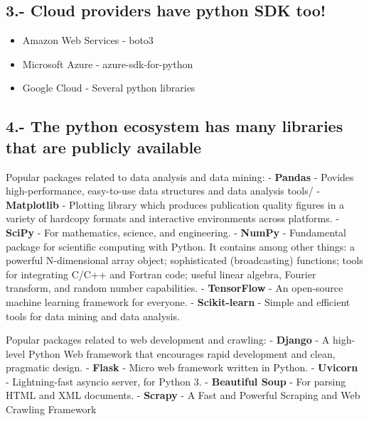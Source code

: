 \documentclass[11pt]{article}
\providecommand{\tightlist}{%
      \setlength{\itemsep}{0pt}\setlength{\parskip}{0pt}}
\begin{document}
    \hypertarget{cloud-providers-have-python-sdk-too}{%
\subsection{3.- Cloud providers have python SDK
too!}\label{cloud-providers-have-python-sdk-too}}

    \begin{itemize}
\tightlist
\item
  Amazon Web Services - boto3
\item
  Microsoft Azure - azure-sdk-for-python
\item
  Google Cloud - Several python libraries
\end{itemize}

    \hypertarget{the-python-ecosystem-has-many-libraries-that-are-publicly-available}{%
\subsection{4.- The python ecosystem has many libraries that are
publicly
available}\label{the-python-ecosystem-has-many-libraries-that-are-publicly-available}}

Popular packages related to data analysis and data mining: -
\textbf{Pandas} - Povides high-performance, easy-to-use data structures
and data analysis tools/ - \textbf{Matplotlib} - Plotting library which
produces publication quality figures in a variety of hardcopy formats
and interactive environments across platforms. - \textbf{SciPy} - For
mathematics, science, and engineering. - \textbf{NumPy} - Fundamental
package for scientific computing with Python. It contains among other
things: a powerful N-dimensional array object; sophisticated
(broadcasting) functions; tools for integrating C/C++ and Fortran code;
useful linear algebra, Fourier transform, and random number
capabilities. - \textbf{TensorFlow} - An open-source machine learning
framework for everyone. - \textbf{Scikit-learn} - Simple and efficient
tools for data mining and data analysis.

Popular packages related to web development and crawling: -
\textbf{Django} - A high-level Python Web framework that encourages
rapid development and clean, pragmatic design. - \textbf{Flask} - Micro
web framework written in Python. - \textbf{Uvicorn} - Lightning-fast
asyncio server, for Python 3. - \textbf{Beautiful Soup} - For parsing
HTML and XML documents. - \textbf{Scrapy} - A Fast and Powerful Scraping
and Web Crawling Framework
\end{document}
